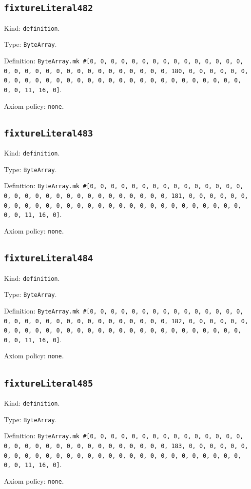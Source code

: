 \documentclass[11pt]{article}
\begin{document}
\subsection*{\texttt{fixtureLiteral482}}
\noindent Kind: \texttt{definition}.\par
\noindent Type: \texttt{ByteArray}.\par
\noindent Definition: \texttt{ByteArray.mk \#[0, 0, 0, 0, 0, 0, 0, 0, 0, 0, 0, 0, 0, 0, 0, 0, 0, 0, 0, 0, 0, 0, 0, 0, 0, 0, 0, 0, 0, 0, 0, 180, 0, 0, 0, 0, 0, 0, 0, 0, 0, 0, 0, 0, 0, 0, 0, 0, 0, 0, 0, 0, 0, 0, 0, 0, 0, 0, 0, 0, 0, 0, 0, 11, 16, 0]}.\par
\noindent Axiom policy: \texttt{none}.\par
\subsection*{\texttt{fixtureLiteral483}}
\noindent Kind: \texttt{definition}.\par
\noindent Type: \texttt{ByteArray}.\par
\noindent Definition: \texttt{ByteArray.mk \#[0, 0, 0, 0, 0, 0, 0, 0, 0, 0, 0, 0, 0, 0, 0, 0, 0, 0, 0, 0, 0, 0, 0, 0, 0, 0, 0, 0, 0, 0, 0, 181, 0, 0, 0, 0, 0, 0, 0, 0, 0, 0, 0, 0, 0, 0, 0, 0, 0, 0, 0, 0, 0, 0, 0, 0, 0, 0, 0, 0, 0, 0, 0, 11, 16, 0]}.\par
\noindent Axiom policy: \texttt{none}.\par
\subsection*{\texttt{fixtureLiteral484}}
\noindent Kind: \texttt{definition}.\par
\noindent Type: \texttt{ByteArray}.\par
\noindent Definition: \texttt{ByteArray.mk \#[0, 0, 0, 0, 0, 0, 0, 0, 0, 0, 0, 0, 0, 0, 0, 0, 0, 0, 0, 0, 0, 0, 0, 0, 0, 0, 0, 0, 0, 0, 0, 182, 0, 0, 0, 0, 0, 0, 0, 0, 0, 0, 0, 0, 0, 0, 0, 0, 0, 0, 0, 0, 0, 0, 0, 0, 0, 0, 0, 0, 0, 0, 0, 11, 16, 0]}.\par
\noindent Axiom policy: \texttt{none}.\par
\subsection*{\texttt{fixtureLiteral485}}
\noindent Kind: \texttt{definition}.\par
\noindent Type: \texttt{ByteArray}.\par
\noindent Definition: \texttt{ByteArray.mk \#[0, 0, 0, 0, 0, 0, 0, 0, 0, 0, 0, 0, 0, 0, 0, 0, 0, 0, 0, 0, 0, 0, 0, 0, 0, 0, 0, 0, 0, 0, 0, 183, 0, 0, 0, 0, 0, 0, 0, 0, 0, 0, 0, 0, 0, 0, 0, 0, 0, 0, 0, 0, 0, 0, 0, 0, 0, 0, 0, 0, 0, 0, 0, 11, 16, 0]}.\par
\noindent Axiom policy: \texttt{none}.\par
\end{document}
